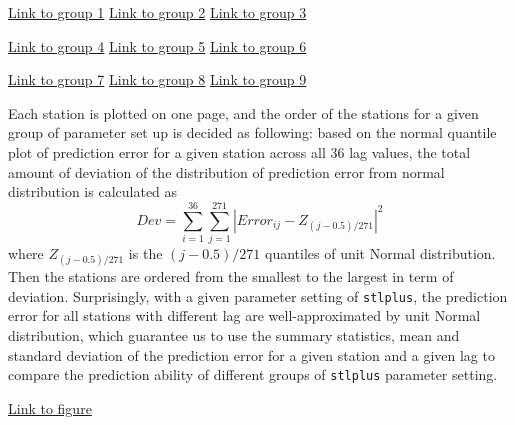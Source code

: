 \begin{framed}
\begin{center}
  \href{../plots/a1950/E1/QQ.error.tmax.group.1.pdf}{Link to group 1} 
  \;\;\;\;\;\;\;\;\;\;
  \href{../plots/a1950/E1/QQ.error.tmax.group.2.pdf}{Link to group 2} 
  \;\;\;\;\;\;\;\;\;\;
  \href{../plots/a1950/E1/QQ.error.tmax.group.3.pdf}{Link to group 3}
\end{center}
\begin{center}
  \href{../plots/a1950/E1/QQ.error.tmax.group.4.pdf}{Link to group 4} 
  \;\;\;\;\;\;\;\;\;\;
  \href{../plots/a1950/E1/QQ.error.tmax.group.5.pdf}{Link to group 5} 
  \;\;\;\;\;\;\;\;\;\;
  \href{../plots/a1950/E1/QQ.error.tmax.group.6.pdf}{Link to group 6}
\end{center}
\begin{center}
  \href{../plots/a1950/E1/QQ.error.tmax.group.7.pdf}{Link to group 7} 
  \;\;\;\;\;\;\;\;\;\;
  \href{../plots/a1950/E1/QQ.error.tmax.group.8.pdf}{Link to group 8} 
  \;\;\;\;\;\;\;\;\;\;
  \href{../plots/a1950/E1/QQ.error.tmax.group.9.pdf}{Link to group 9}
  \label{QQ.error.laggroup.E1}
\end{center}
\end{framed}

Each station is plotted on one page, and the order of the stations for a given 
group of parameter set up is decided as following: 
based on the normal quantile plot of prediction error for a given station across 
all 36 lag values, the total amount of deviation of the distribution of prediction 
error from normal distribution is calculated as
$$
Dev = \sum_{i=1}^{36} \sum_{j=1}^{271} |Error_{ij} - Z_{(j-0.5)/271}|^2
$$
where $Z_{(j-0.5)/271}$ is the $(j-0.5)/271$ quantiles of unit Normal distribution.
Then the stations are ordered from the smallest to the largest in term of 
deviation. Surprisingly, with a given parameter setting of \texttt{stlplus}, the
prediction error for all stations with different lag are well-approximated by
unit Normal distribution, which guarantee us to use the summary statistics, mean
and standard deviation of the prediction error for a given station and a given
lag to compare the prediction ability of different groups of \texttt{stlplus}
parameter setting. 

\begin{framed}
\begin{center}
  \href{../plots/a1950/E1/tmax.mean.absmeans.error.sw.pdf}{Link to figure}
  \label{e1.abserror.sw}
\end{center}
\end{framed}

